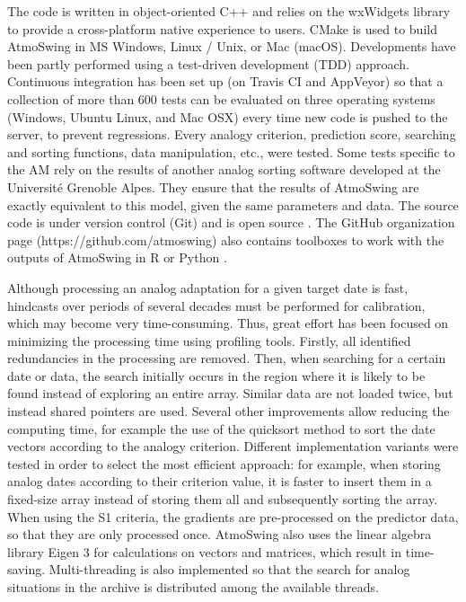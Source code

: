 \documentclass[gmdd]{copernicus}
\begin{document}
The code is written in object-oriented C++ and relies on the wxWidgets \citep{Smart2006} library to provide a cross-platform native experience to users. CMake is used to build AtmoSwing in MS Windows, Linux / Unix, or Mac (macOS). Developments have been partly performed using a test-driven development (TDD) approach. Continuous integration has been set up (on Travis CI and AppVeyor) so that a collection of more than 600 tests can be evaluated on three operating systems (Windows, Ubuntu Linux, and Mac OSX) every time new code is pushed to the server, to prevent regressions. Every analogy criterion, prediction score, searching and sorting functions, data manipulation, etc., were tested. Some tests specific to the AM rely on the results of another analog sorting software developed at the Universit\'{e} Grenoble Alpes. They ensure that the results of AtmoSwing are exactly equivalent to this model, given the same parameters and data. The source code is under version control (Git) and is open source \citep[on GitHub, www.atmoswing.org,][]{Horton2018c}. The GitHub organization page (https://github.com/atmoswing) also contains toolboxes to work with the outputs of AtmoSwing in R \citep{Horton2018d} or Python \citep{Horton2018e}.

Although processing an analog adaptation for a given target date is fast, hindcasts over periods of several decades must be performed for calibration, which may become very time-consuming. Thus, great effort has been focused on minimizing the processing time using profiling tools. Firstly, all identified redundancies in the processing are removed. Then, when searching for a certain date or data, the search initially occurs in the region where it is likely to be found instead of exploring an entire array. Similar data are not loaded twice, but instead shared pointers are used. Several other improvements allow reducing the computing time, for example the use of the quicksort method \citep{Hoare1962a} to sort the date vectors according to the analogy criterion. Different implementation variants were tested in order to select the most efficient approach: for example, when storing analog dates according to their criterion value, it is faster to insert them in a fixed-size array instead of storing them all and subsequently sorting the array. When using the S1 criteria, the gradients are pre-processed on the predictor data, so that they are only processed once. AtmoSwing also uses the linear algebra library Eigen 3 \citep{Guennebaud2010} for calculations on vectors and matrices, which result in time-saving. Multi-threading is also implemented so that the search for analog situations in the archive is distributed among the available threads. 
\end{document}
